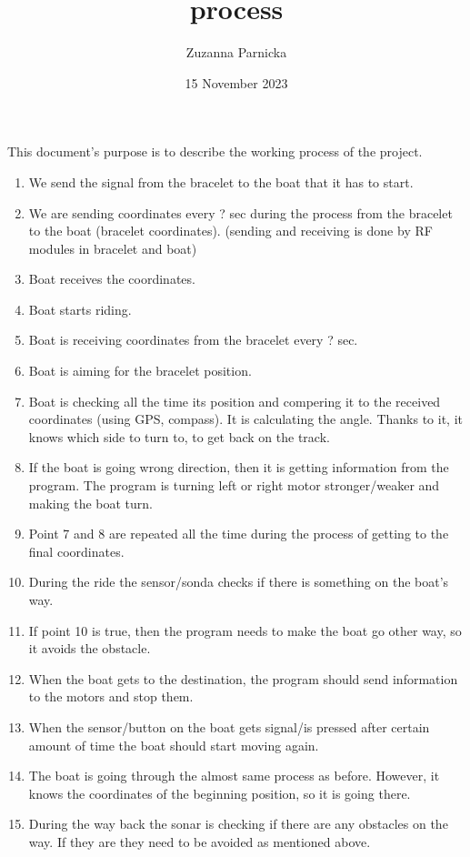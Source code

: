 \documentclass{article}[10pt]
\title{process}
\author{Zuzanna Parnicka}
\date{15 November 2023}
\begin{document}
\maketitle

This document's purpose is to describe the working process of the project.
\begin{enumerate}
    \item We send the signal from the bracelet to the boat that it has to start.
    \item We are sending coordinates every ? sec during the process from the bracelet to the boat (bracelet coordinates). (sending and receiving is done by RF modules in bracelet and boat)
    \item Boat receives the coordinates.
    \item Boat starts riding.
    \item Boat is receiving coordinates from the bracelet every ? sec.
    \item Boat is aiming for the bracelet position.
    \item Boat is checking all the time its position and compering it to the received coordinates (using GPS, compass). It is calculating the angle. Thanks to it, it knows which side to turn to, to get back on the track.
    \item If the boat is going wrong direction, then it is getting information from the program. The program is turning left or right motor stronger/weaker and making the boat turn. 
    \item Point 7 and 8 are repeated all the time during the process of getting to the final coordinates.
    \item During the ride the sensor/sonda checks if there is something on the boat’s way.
    \item If point 10 is true, then the program needs to make the boat go other way, so it avoids the obstacle.
    \item When the boat gets to the destination, the program should send information to the motors and stop them.
    \item When the sensor/button on the boat gets signal/is pressed after certain amount of time the boat should start moving again.
    \item The boat is going through the almost same process as before. However, it knows the coordinates of the beginning position, so it is going there. 
    \item During the way back the sonar is checking if there are any obstacles on the way. If they are they need to be avoided as mentioned above.
    
\end{enumerate}
\end{document}
